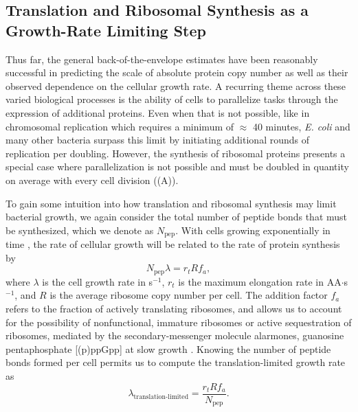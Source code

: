 
\subsection{Translation and Ribosomal Synthesis as a Growth-Rate Limiting Step}
Thus far, the general back-of-the-envelope estimates have been reasonably
successful in predicting the scale of absolute protein copy number as well as
their observed dependence on the cellular growth rate. A recurring theme across
these varied biological processes is the ability of cells to  parallelize tasks
through the expression of additional proteins.  Even when that is not possible,
like in chromosomal replication which  requires a minimum of $\approx$ 40
minutes, \textit{E. coli} and many other bacteria surpass this limit by
initiating additional rounds of replication per doubling. However, the synthesis
of ribosomal proteins presents a special case where parallelization is not
possible and must be doubled in quantity on average with every cell division
((A)).

To gain some intuition into how translation and ribosomal synthesis may limit
bacterial growth, we again consider the total number of peptide bonds that must
be synthesized, which we denote as $N_\text{pep}$. With cells growing exponentially in time
\citep{godin2010}, the rate of cellular growth will be related to the rate of protein synthesis by
\begin{equation}
    N_\text{pep} \lambda = r_t R f_a,
    \label{eq:mass_balance}
\end{equation}
where $\lambda$ is the cell growth rate in s$^{-1}$, $r_t$ is the maximum
elongation rate in AA$\cdot$s$^{-1}$, and $R$ is the average ribosome copy
number per cell. The addition factor $f_a$ refers to the fraction of actively
translating ribosomes, and allows us to account for the possibility of
nonfunctional, immature ribosomes or active sequestration of ribosomes, mediated
by the secondary-messenger molecule alarmones, guanosine pentaphosphate
[(p)ppGpp] at slow growth \citep{dennis2004, dai2016}. Knowing the number of
peptide bonds formed per cell permits us to compute the translation-limited growth
rate as
\begin{equation}
\lambda_\text{translation-limited} = \frac{r_t R f_a}{N_\text{pep}}.
\label{eq:lambda_limit}
\end{equation}

